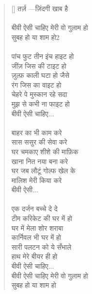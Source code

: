 \begin{verse}[\versewidth]\texthindi{
तर्ज़ —ज़िंदगी खाब है \\
\\
बीवी ऐसी चाहिए मेरी वो गुलाम हो\\
सुबह हो या शाम हो2\\
\\
पांच फुट तीन इंच हाइट हो\\
जींज़ जिस की टाइट हो\\
ज़ुल्फ़ काली घटा हो जैसे\\
रंग जिस का वाइट हो\\
चेहरे पे मुस्कान रहे सदा\\
मुझ से कभी ना फाइट हो\\
बीवी ऐसी चाहिए...\\
\\
बाहर का भी काम करे\\
सास ससुर की सेवा करे\\
घर चमकाए शीशे की माफ़िक\\
खाना नित नया बना करे\\
घर जब लौटूं गोल्फ खेल के\\
मालिश मेरी किया करे\\
बीवी ऐसी...\\
\\
एक दर्जन बच्चे दे दे\\
टीम करिकेट की घर में हो\\
घर में मेला शोर शराबा\\
कार्निवल भी घर में हो\\
सारी पलटन को ये सँभाले\\
हाथ मेरे बीयर ही हो\\
बीवी ऐसी चाहिए...\\
बीवी ऐसी चाहिए मेरी वो गुलाम हो\\
सुबह हो या शाम हो
}\end{verse}

